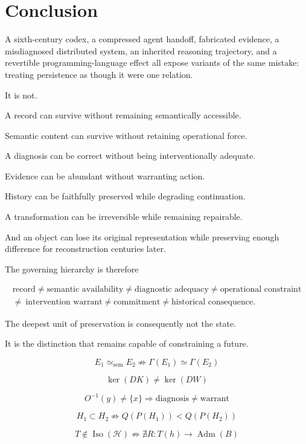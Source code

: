 \documentclass[11pt]{article}
\newcommand{\Adm}{\operatorname{Adm}}
\newcommand{\Iso}{\operatorname{Iso}}
\newcommand{\semEq}{\simeq_{\mathrm{sem}}}
\begin{document}
\section{Conclusion}

A sixth-century codex, a compressed agent handoff, fabricated evidence, a misdiagnosed distributed system, an inherited reasoning trajectory, and a revertible programming-language effect all expose variants of the same mistake: treating persistence as though it were one relation.

It is not.

A record can survive without remaining semantically accessible.

Semantic content can survive without retaining operational force.

A diagnosis can be correct without being interventionally adequate.

Evidence can be abundant without warranting action.

History can be faithfully preserved while degrading continuation.

A transformation can be irreversible while remaining repairable.

And an object can lose its original representation while preserving enough difference for reconstruction centuries later.

The governing hierarchy is therefore

\[ \boxed{ \begin{gathered} \text{record} \neq \text{semantic availability} \neq \text{diagnostic adequacy} \neq \text{operational constraint} \\ \neq\ \text{intervention warrant} \neq \text{commitment} \neq \text{historical consequence}. \end{gathered} }\]

The deepest unit of preservation is consequently not the state.

It is the distinction that remains capable of constraining a future.

\[ \boxed{ E_1\semEq E_2 \not\Rightarrow \Gamma(E_1)\simeq\Gamma(E_2) }\]

\[ \boxed{ \ker(DK)\neq\ker(DW) }\]

\[ \boxed{ O^{-1}(y)\neq\{x\} \Longrightarrow \text{diagnosis}\neq\text{warrant} }\]

\[ \boxed{ H_1\subset H_2 \not\Rightarrow Q(P(H_1))<Q(P(H_2)) }\]

\[ \boxed{ T\notin\Iso(\mathcal H) \not\Rightarrow \nexists R:T(h)\rightarrow\Adm(B) }\]
\end{document}
